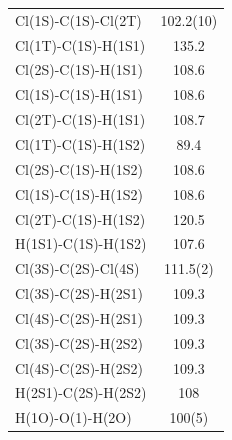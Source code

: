 \begin{center}
{\begin{supertabular}{p{1.5in}c}
Cl(1S)-C(1S)-Cl(2T)&102.2(10)\\
Cl(1T)-C(1S)-H(1S1)&135.2\\
Cl(2S)-C(1S)-H(1S1)&108.6\\
Cl(1S)-C(1S)-H(1S1)&108.6\\
Cl(2T)-C(1S)-H(1S1)&108.7\\
Cl(1T)-C(1S)-H(1S2)&89.4\\
Cl(2S)-C(1S)-H(1S2)&108.6\\
Cl(1S)-C(1S)-H(1S2)&108.6\\
Cl(2T)-C(1S)-H(1S2)&120.5\\
H(1S1)-C(1S)-H(1S2)&107.6\\
Cl(3S)-C(2S)-Cl(4S)&111.5(2)\\
Cl(3S)-C(2S)-H(2S1)&109.3\\
Cl(4S)-C(2S)-H(2S1)&109.3\\
Cl(3S)-C(2S)-H(2S2)&109.3\\
Cl(4S)-C(2S)-H(2S2)&109.3\\
H(2S1)-C(2S)-H(2S2)&108\\
H(1O)-O(1)-H(2O)&100(5)\\
\end{supertabular}
}
\end{center}

